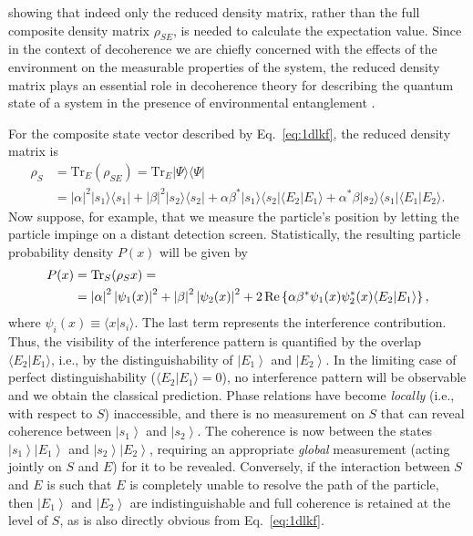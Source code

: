 \documentclass[3p,sort&compress,12pt]{elsarticle}
\newcommand{\ket}[1]{\left\vert{#1}\right\rangle}
\newcommand{\braket}[2]{\ensuremath{{\langle #1}|{#2 \rangle}}}
\newcommand{\ketbra}[2]{\ensuremath{|{#1 \rangle}{\langle #2}|}}
\providecommand{\abs}[1]{\left\lvert#1\right\rvert}
\newcommand{\op}[1]{#1}
\begin{document}
%
showing that indeed only the reduced density matrix, rather than the full composite density matrix $\op{\rho}_{SE}$, is needed to calculate the expectation value. Since in the context of decoherence we are chiefly concerned with the effects of the environment on the measurable properties of the system, the reduced density matrix  plays an essential role in decoherence theory for describing the quantum state of a system in the presence of environmental entanglement \cite{Zurek:1981:dd,Zurek:1982:tv,Schlosshauer:2007:un}. 

For the composite state vector described by Eq.~\eqref{eq:1dlkf}, the reduced density matrix is \cite{Schlosshauer:2007:un}
%
\begin{align}
  \label{eq:aa12}
 \op{\rho}_S &= \text{Tr}_E(\op{\rho}_{SE}) =\text{Tr}_E \ketbra{\Psi}{\Psi} \nonumber \\
 &= \abs{\alpha}^2
    \ketbra{s_1}{s_1} + \abs{\beta}^2 \ketbra{s_2}{s_2} + \alpha \beta^*\ketbra{s_1}{s_2}
      \braket{E_2}{E_1} +  \alpha^*\beta\ketbra{s_2}{s_1}
      \braket{E_1}{E_2}.
\end{align}
%
Now suppose, for example, that we measure the particle's position by letting the particle impinge on a distant detection screen. Statistically, the resulting particle probability density $P(x)$ will be given by
%
\begin{align}\label{eq:fdljksjk2}
P(x) & = \text{Tr}_S(\op{\rho}_S x) = \notag \\ &= \abs{\alpha}^2
\abs{\psi_1(x)}^2 +\abs{\beta}^2 \abs{\psi_2(x)}^2 + 2 \,\text{Re} \left\{\alpha \beta^* \psi_1(x) \psi_2^*(x)\braket{E_2}{E_1} \right\},
\end{align}
%
where $\psi_i(x) \equiv \braket{x}{s_i}$. The last term represents the interference contribution. Thus, the visibility of the interference pattern is quantified by the overlap $\braket{E_2}{E_1}$, i.e., by the distinguishability of $\ket{E_1}$ and $\ket{E_2}$. In the limiting case of perfect distinguishability ($\braket{E_2}{E_1} = 0$), no interference pattern will be observable and we obtain the classical prediction. Phase relations have become \emph{locally} (i.e., with respect to $S$) inaccessible, and there is no measurement on $S$ that can reveal coherence between $\ket{s_1}$ and $\ket{s_2}$. The coherence is now between the states  $\ket{s_1} \ket{E_1}$ and $\ket{s_2} \ket{E_2}$, requiring an appropriate \emph{global} measurement (acting jointly on $S$ and $E$) for it to be revealed. Conversely, if the interaction between $S$ and $E$ is such that $E$ is completely unable to resolve the path of the particle, then $\ket{E_1}$ and $\ket{E_2}$ are indistinguishable and full coherence is retained at the level of $S$, as is also directly obvious from Eq.~\eqref{eq:1dlkf}. 
\end{document}
